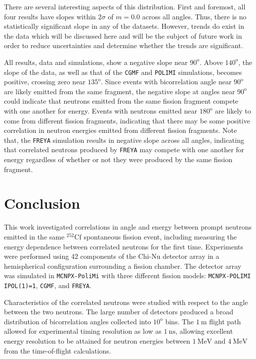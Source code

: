 \documentclass[preprint,12pt]{elsarticle}
\newcommand{\mcnpxpolimi}     {\texttt{MCNPX-PoliMi}\xspace}
\newcommand{\cgmf}            {\texttt{CGMF}\xspace}
\newcommand{\freya}           {\texttt{FREYA}\xspace}
\newcommand{\polimi}          {\texttt{POLIMI}\xspace}
\newcommand{\polimiipol}      {\texttt{MCNPX-POLIMI IPOL(1)=1}\xspace}
\newcommand{\genunit}[2]{\ensuremath{#1~\text{#2}}\xspace}
\newcommand{\meters}[1] {\genunit{#1}{m}}
\newcommand{\MeV}[1]    {\genunit{#1}{MeV}}
\newcommand{\ns}[1]{\genunit{#1}{ns}}
\newcommand{\degrees}[1]{\ensuremath{#1^{\mathrm{o}}}\xspace}
\newcommand{\Cftft}{\ensuremath{^{252}\text{Cf}}\xspace}
\begin{document}
There are several interesting aspects of this distribution. First and foremost, all four results have slopes within $2\sigma$ of $m=0.0$ across all angles. Thus, there is no statistically significant slope in any of the datasets. However, trends do exist in the data which will be discussed here and will be the subject of future work in order to reduce uncertainties and determine whether the trends are significant. 


All results, data and simulations, show a negative slope near \degrees{90}. Above \degrees{140}, the slope of the data, as well as that of the \cgmf and \polimi simulations, becomes positive, crossing zero near \degrees{135}. Since events with bicorrelation angle near \degrees{90} are likely emitted from the same fragment, the negative slope at angles near \degrees{90} could indicate that neutrons emitted from the same fission fragment compete with one another for energy. Events with neutrons emitted near \degrees{180} are likely to come from different fission fragments, indicating that there may be some positive correlation in neutron energies emitted from different fission fragments. Note that, the \freya simulation results in negative slope across all angles, indicating that correlated neutrons produced by \freya may compete with one another for energy regardless of whether or not they were produced by the same fission fragment. 

\section{Conclusion}

This work investigated correlations in angle and energy between prompt neutrons emitted in the same \Cftft spontaneous fission event, including measuring the energy dependence between correlated neutrons for the first time. Experiments were performed using 42 components of the Chi-Nu detector array in a hemispherical configuration surrounding a fission chamber. The detector array was simulated in \mcnpxpolimi with three different fission models: \polimiipol, \cgmf, and \freya.

Characteristics of the correlated neutrons were studied with respect to the angle between the two neutrons. The large number of detectors produced a broad distribution of bicorrelation angles collected into \degrees{10} bins. The \meters{1} flight path allowed for experimental timing resolution as low as \ns{1}, allowing excellent energy resolution to be attained for neutron energies between \MeV{1} and \MeV{4} from the time-of-flight calculations. 
\end{document}
